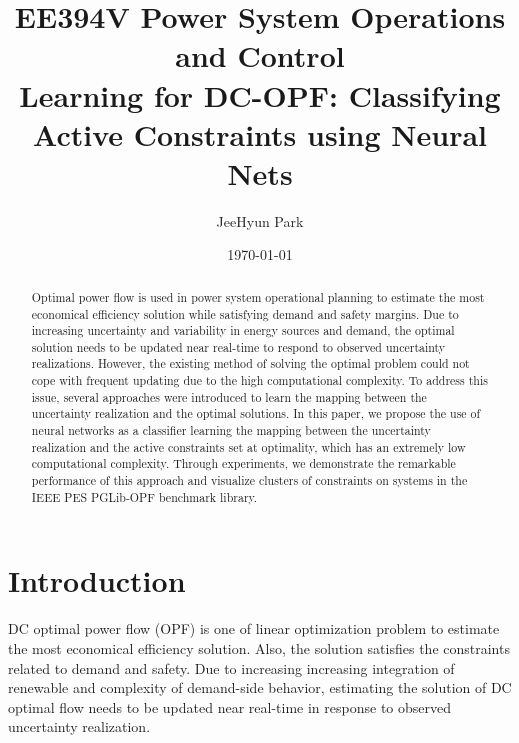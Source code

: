 \documentclass[11pt]{article}
\begin{document}
\title{\bf EE394V Power System Operations and Control\\
Learning for DC-OPF: Classifying Active Constraints using Neural Nets 
}
\date{\today}
\author{JeeHyun Park}
\maketitle

\begin{abstract}
Optimal power flow is used in power system operational planning to estimate the most economical efficiency solution while satisfying demand and safety margins. Due to increasing uncertainty and variability in energy sources and demand, the optimal solution needs to be updated near real-time to respond to observed uncertainty realizations. However, the existing method of solving the optimal problem could not cope with frequent updating due to the high computational complexity. To address this issue, several approaches were introduced to learn the mapping between the uncertainty realization and the optimal solutions. In this paper, we propose the use of neural networks as a classifier learning the mapping between the uncertainty realization and the active constraints set at optimality, which has an extremely low computational complexity. Through experiments, we demonstrate the remarkable performance of this approach and visualize clusters of constraints on systems in the IEEE PES PGLib-OPF benchmark library.
\end{abstract}

\section{Introduction}\label{sec:intro}
DC optimal power flow (OPF) is one of linear optimization problem to estimate the most economical efficiency solution. Also, the solution satisfies the constraints related to demand and safety. Due to increasing increasing integration of renewable and complexity of demand-side behavior, estimating the solution of DC optimal flow needs to be updated near real-time in response to observed uncertainty realization. 
\end{document}
